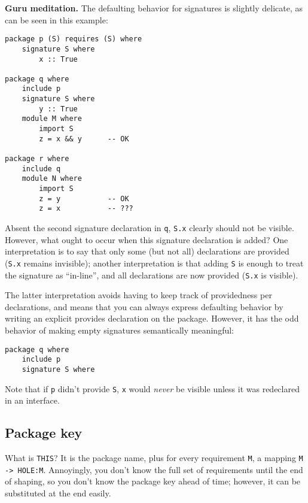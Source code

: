 \documentclass{article}
\newenvironment{aside}
  {\begin{mdframed}[style=0,%
      leftline=false,rightline=false,leftmargin=2em,rightmargin=2em,%
          innerleftmargin=0pt,innerrightmargin=0pt,linewidth=0.75pt,%
      skipabove=7pt,skipbelow=7pt]\small}
  {\end{mdframed}}
\begin{document}
\begin{aside}
\textbf{Guru meditation.}  The defaulting behavior for signatures
is slightly delicate, as can be seen in this example:

\begin{verbatim}
package p (S) requires (S) where
    signature S where
        x :: True

package q where
    include p
    signature S where
        y :: True
    module M where
        import S
        z = x && y      -- OK

package r where
    include q
    module N where
        import S
        z = y           -- OK
        z = x           -- ???
\end{verbatim}

Absent the second signature declaration in \verb|q|, \verb|S.x| clearly
should not be visible.  However, what ought to occur when this signature
declaration is added?  One interpretation is to say that only some
(but not all) declarations are provided (\verb|S.x| remains invisible);
another interpretation is that adding \verb|S| is enough to treat
the signature as ``in-line'', and all declarations are now provided
(\verb|S.x| is visible).

The latter interpretation avoids having to keep track of providedness
per declarations, and means that you can always express defaulting
behavior by writing an explicit provides declaration on the package.
However, it has the odd behavior of making empty signatures semantically
meaningful:

\begin{verbatim}
package q where
    include p
    signature S where
\end{verbatim}

Note that if \verb|p| didn't provide \verb|S|, \verb|x| would \emph{never}
be visible unless it was redeclared in an interface.
\end{aside}
%

\subsection{Package key}

What is \verb|THIS|?  It is the package name, plus for every requirement \verb|M|,
a mapping \verb|M -> HOLE:M|.  Annoyingly, you don't know the full set of
requirements until the end of shaping, so you don't know the package key ahead of time;
however, it can be substituted at the end easily.
\end{document}
